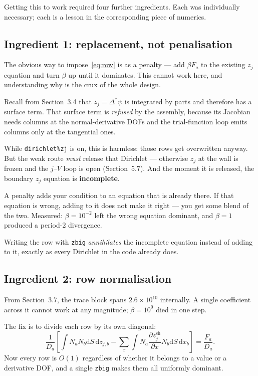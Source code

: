 \documentclass[11pt,a4paper]{article}
\newcommand{\zj}{z_j}
\newcommand{\zjsh}{z^{\mathrm{sh}}_{j}}
\newcommand{\dd}{\mathrm{d}}
\newcommand{\code}[1]{\texttt{\small #1}}
\begin{document}
Getting this to work required four further ingredients. Each was individually necessary; each is a
lesson in the corresponding piece of numerics.

\subsection{Ingredient 1: replacement, not penalisation}

The obvious way to impose~\eqref{eq:row} is as a penalty --- add $\beta F_a$ to the existing $\zj$
equation and turn $\beta$ up until it dominates. This cannot work here, and understanding why is the
crux of the whole design.

Recall from Section~3.4 that $\zj=\Delta^{*}\psi$ is integrated by parts and therefore has a surface
term. That surface term is \emph{refused} by the assembly, because its Jacobian needs columns at the
normal-derivative DOFs and the trial-function loop emits columns only at the tangential ones.

While \code{dirichlet\%zj} is on, this is harmless: those rows get overwritten anyway. But the weak
route \emph{must} release that Dirichlet --- otherwise $\zj$ at the wall is frozen and the $j$--$V$
loop is open (Section~5.7). And the moment it is released, the boundary $\zj$ equation is
\textbf{incomplete}.

\begin{plain}
A penalty adds your condition to an equation that is already there. If that equation is wrong, adding
to it does not make it right --- you get some blend of the two. Measured: $\beta=10^{-2}$ left the
wrong equation dominant, and $\beta=1$ produced a period-2 divergence.
\end{plain}

Writing the row with \code{zbig} \emph{annihilates} the incomplete equation instead of adding to it,
exactly as every Dirichlet in the code already does.

\subsection{Ingredient 2: row normalisation}

From Section~3.7, the trace block spans $2.6\times10^{10}$ internally. A single coefficient across it
cannot work at any magnitude; $\beta=10^9$ died in one step.

The fix is to divide each row by its own diagonal:
\begin{equation}
  \frac{1}{D_a}\left[\int N_a N_b \dd S\,\dd z_{j,b}
  - \sum_x \int N_a \frac{\partial \zjsh}{\partial x} N_b \dd S\,\dd x_b\right]
  = \frac{F_a}{D_a}.
\end{equation}
Now every row is $O(1)$ regardless of whether it belongs to a value or a derivative DOF, and a single
\code{zbig} makes them all uniformly dominant.
\end{document}

